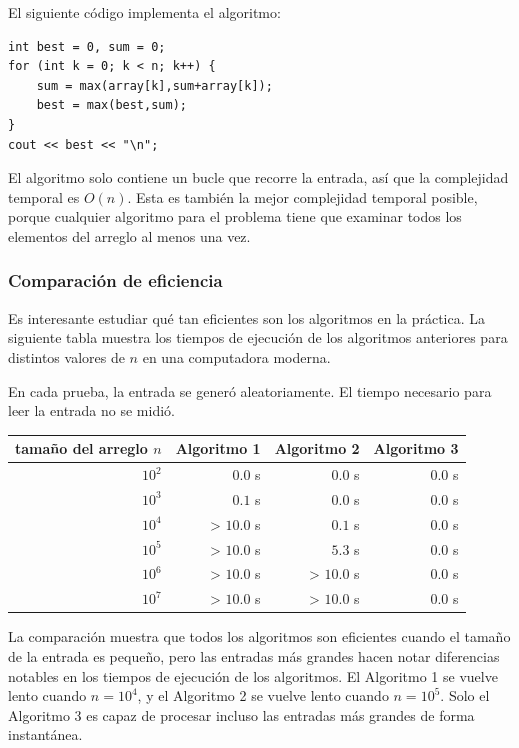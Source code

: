 El siguiente código implementa el algoritmo:
\begin{lstlisting}
int best = 0, sum = 0;
for (int k = 0; k < n; k++) {
    sum = max(array[k],sum+array[k]);
    best = max(best,sum);
}
cout << best << "\n";
\end{lstlisting}

El algoritmo solo contiene un bucle
que recorre la entrada,
así que la complejidad temporal es $O(n)$.
Esta es también la mejor complejidad temporal posible,
porque cualquier algoritmo para el problema
tiene que examinar todos los elementos del arreglo al menos una vez.

\subsubsection{Comparación de eficiencia}

Es interesante estudiar qué tan eficientes
son los algoritmos en la práctica.
La siguiente tabla muestra los tiempos de ejecución
de los algoritmos anteriores para distintos
valores de $n$ en una computadora moderna.

En cada prueba, la entrada se generó aleatoriamente.
El tiempo necesario para leer la entrada no se
midió.

\begin{center}
\begin{tabular}{rrrr}
tamaño del arreglo $n$ & Algoritmo 1 & Algoritmo 2 & Algoritmo 3 \\
\hline
$10^2$ & $0.0$ s & $0.0$ s & $0.0$ s \\
$10^3$ & $0.1$ s & $0.0$ s & $0.0$ s \\
$10^4$ & > $10.0$ s & $0.1$ s & $0.0$ s \\
$10^5$ & > $10.0$ s & $5.3$ s & $0.0$ s \\
$10^6$ & > $10.0$ s & > $10.0$ s & $0.0$ s \\
$10^7$ & > $10.0$ s & > $10.0$ s & $0.0$ s \\
\end{tabular}
\end{center}

La comparación muestra que todos los algoritmos
son eficientes cuando el tamaño de la entrada es pequeño,
pero las entradas más grandes hacen notar diferencias
notables en los tiempos de ejecución de los algoritmos.
El Algoritmo 1 se vuelve lento
cuando $n=10^4$, y el Algoritmo 2
se vuelve lento cuando $n=10^5$.
Solo el Algoritmo 3 es capaz de procesar
incluso las entradas más grandes de forma instantánea.
